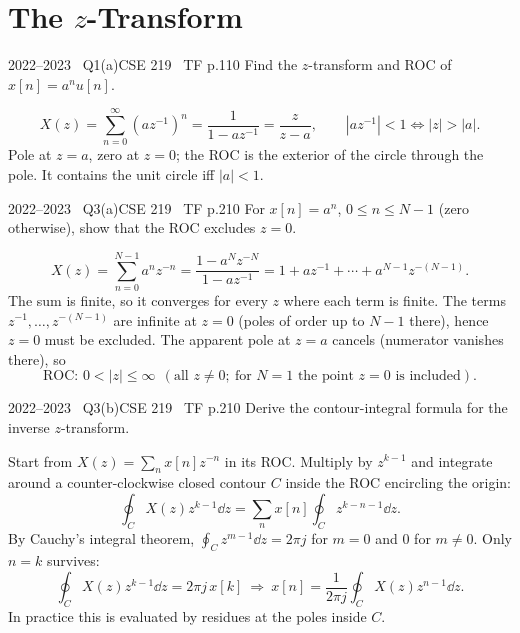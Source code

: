 \renewcommand{\teacherTag}{ASHRAF SIR \textbullet\ Z-TRANSFORM}
\chapter{The $z$-Transform}


\begin{qcard}{2022--2023 \textbullet\ Q1(a)}{CSE 219 \textbullet\ TF p.1}{10}
Find the $z$-transform and ROC of $x[n]=a^nu[n]$.
\end{qcard}
\begin{solution}
\[X(z)=\sum_{n=0}^\infty(az^{-1})^n=\frac1{1-az^{-1}}=\frac z{z-a},\qquad |az^{-1}|<1\iff|z|>|a| .\]
Pole at $z=a$, zero at $z=0$; the ROC is the exterior of the circle through the pole. It contains the unit circle iff $|a|<1$.
\end{solution}

\begin{qcard}{2022--2023 \textbullet\ Q3(a)}{CSE 219 \textbullet\ TF p.2}{10}
For $x[n]=a^n$, $0\le n\le N-1$ (zero otherwise), show that the ROC excludes $z=0$.
\end{qcard}
\begin{solution}
\[X(z)=\sum_{n=0}^{N-1}a^nz^{-n}=\frac{1-a^Nz^{-N}}{1-az^{-1}}=1+az^{-1}+\cdots+a^{N-1}z^{-(N-1)}.\]
The sum is finite, so it converges for every $z$ where each term is finite. The terms $z^{-1},\dots,z^{-(N-1)}$ are infinite at $z=0$ (poles of order up to $N-1$ there), hence $z=0$ must be excluded. The apparent pole at $z=a$ cancels (numerator vanishes there), so
\[\text{ROC: }0<|z|\le\infty\ \ (\text{all }z\ne0;\ \text{for }N=1\text{ the point }z=0\text{ is included}).\]
\end{solution}

\begin{qcard}{2022--2023 \textbullet\ Q3(b)}{CSE 219 \textbullet\ TF p.2}{10}
Derive the contour-integral formula for the inverse $z$-transform.
\end{qcard}
\begin{solution}
Start from $X(z)=\sum_nx[n]z^{-n}$ in its ROC. Multiply by $z^{k-1}$ and integrate around a counter-clockwise closed contour $C$ inside the ROC encircling the origin:
\[\oint_CX(z)z^{k-1}\dd z=\sum_nx[n]\oint_Cz^{k-n-1}\dd z .\]
By Cauchy's integral theorem, $\oint_Cz^{m-1}\dd z=2\pi j$ for $m=0$ and $0$ for $m\ne0$. Only $n=k$ survives:
\[\oint_CX(z)z^{k-1}\dd z=2\pi j\,x[k]\ \Rightarrow\ x[n]=\frac1{2\pi j}\oint_CX(z)z^{n-1}\dd z .\]
In practice this is evaluated by residues at the poles inside $C$.
\end{solution}

